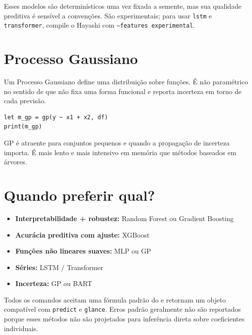 Esses modelos são determinísticos uma vez fixada a semente, mas sua
qualidade preditiva é sensível a convenções. São experimentais; para usar
\texttt{lstm} e \texttt{transformer}, compile o Hayashi com \texttt{--features experimental}.

\section{Processo Gaussiano}

Um Processo Gaussiano define uma distribuição sobre funções. É não
paramétrico no sentido de que não fixa uma forma funcional e reporta
incerteza em torno de cada previsão.

\begin{lstlisting}[caption={Regressão com Processo Gaussiano}]
let m_gp = gp(y ~ x1 + x2, df)
print(m_gp)
\end{lstlisting}

GP é atraente para conjuntos pequenos e quando a propagação de
incerteza importa. É mais lento e mais intensivo em memória que métodos
baseados em árvores.

\section{Quando preferir qual?}

\begin{itemize}
\item \textbf{Interpretabilidade + robustez:} Random Forest ou Gradient Boosting
\item \textbf{Acurácia preditiva com ajuste:} XGBoost
\item \textbf{Funções não lineares suaves:} MLP ou GP
\item \textbf{Séries:} LSTM / Transformer
\item \textbf{Incerteza:} GP ou BART
\end{itemize}

Todos os comandos aceitam uma fórmula padrão do \hayashi{} e retornam um
objeto compatível com \texttt{predict} e \texttt{glance}. Erros padrão geralmente não
são reportados porque esses métodos não são projetados para inferência
direta sobre coeficientes individuais.
